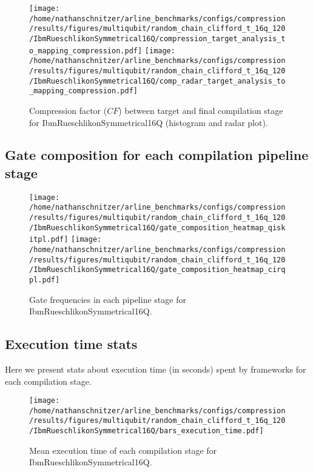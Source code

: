 \documentclass{report}%
\begin{document}
%


\begin{figure}[h!]%
\centering%
\texttt{[image: /home/nathanschnitzer/arline\_benchmarks/configs/compression/results/figures/multiqubit/random\_chain\_clifford\_t\_16q\_120/IbmRueschlikonSymmetrical16Q/compression\_target\_analysis\_to\_mapping\_compression.pdf]}%
\centering%
\texttt{[image: /home/nathanschnitzer/arline\_benchmarks/configs/compression/results/figures/multiqubit/random\_chain\_clifford\_t\_16q\_120/IbmRueschlikonSymmetrical16Q/comp\_radar\_target\_analysis\_to\_mapping\_compression.pdf]}%
\caption{Compression factor ($CF$) between target and final compilation stage for IbmRueschlikonSymmetrical16Q
                        (histogram and radar plot).
                        }%
\end{figure}

%
\clearpage%
\subsection*{Gate composition for each compilation pipeline stage}%
\label{subsec:Gatecompositionforeachcompilationpipelinestage}%

%


\begin{figure}[h!]%
\centering%
\texttt{[image: /home/nathanschnitzer/arline\_benchmarks/configs/compression/results/figures/multiqubit/random\_chain\_clifford\_t\_16q\_120/IbmRueschlikonSymmetrical16Q/gate\_composition\_heatmap\_qiskitpl.pdf]}%
\centering%
\texttt{[image: /home/nathanschnitzer/arline\_benchmarks/configs/compression/results/figures/multiqubit/random\_chain\_clifford\_t\_16q\_120/IbmRueschlikonSymmetrical16Q/gate\_composition\_heatmap\_cirqpl.pdf]}%
\linebreak%
\caption{Gate frequencies in each pipeline stage for IbmRueschlikonSymmetrical16Q.}%
\end{figure}

%
\subsection*{Execution time stats }%
\label{subsec:Executiontimestats}%

%
Here we present stats about execution time (in seconds)
                spent by frameworks for each compilation stage.%


\begin{figure}[h!]%
\centering%
\texttt{[image: /home/nathanschnitzer/arline\_benchmarks/configs/compression/results/figures/multiqubit/random\_chain\_clifford\_t\_16q\_120/IbmRueschlikonSymmetrical16Q/bars\_execution\_time.pdf]}%
\caption{Mean execution time of each compilation stage for IbmRueschlikonSymmetrical16Q.}%
\end{figure}
\end{document}
